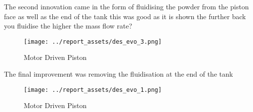 The second innovation came in the form of fluidising the powder from the piston face as well as the end of the tank
this was good as it is shown the further back you fluidise the higher the mass flow rate?
\begin{figure}[htbp]
    \centering
    
    \begin{minipage}{0.9\textwidth}
        \centering
        \texttt{[image: ../report\_assets/des\_evo\_3.png]}
        \caption*{Motor Driven Piston~\cite{SUN201630}}
    \end{minipage}
   
\end{figure}

The final improvement was removing the fluidisation at the end of the tank
\begin{figure}[htbp]
    \centering
    
    \begin{minipage}{0.9\textwidth}
        \centering
        \texttt{[image: ../report\_assets/des\_evo\_1.png]}
        \caption*{Motor Driven Piston~\cite{SUN201630}}
    \end{minipage}
   
\end{figure}



\newpage
